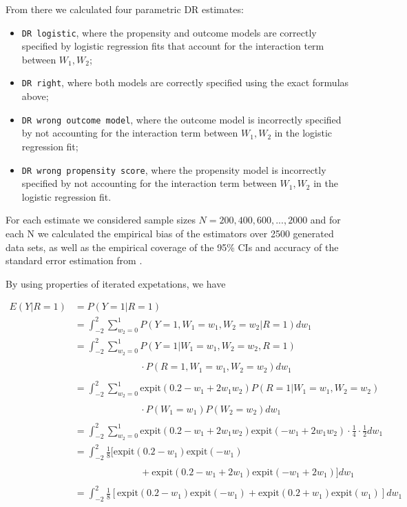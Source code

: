 \documentclass[12pt,twoside]{article}
\newcommand{\expit}{\text{expit}}
\begin{document}
From there we calculated four parametric DR estimates: 
\begin{itemize}
    \item \texttt{DR logistic}, where the propensity and outcome models are correctly specified by logistic regression fits that account for the interaction term between $W_1, W_2$;
    \item \texttt{DR right}, where both models are correctly specified using the exact formulas above;
    \item \texttt{DR wrong outcome model}, where the outcome model is incorrectly specified by not accounting for the interaction term between $W_1, W_2$ in the logistic regression fit;
    \item \texttt{DR wrong propensity score}, where the propensity model is incorrectly specified by not accounting for the interaction term between $W_1, W_2$ in the logistic regression fit.
\end{itemize}

For each estimate we considered sample sizes $N = 200, 400, 600, ..., 2000$ and for each N we calculated the empirical bias of the estimators over 2500 generated data sets, as well as the empirical coverage of the 95\% CIs and accuracy of the standard error estimation from \citet{lunceford_davidian}.

By using properties of iterated expetations, we have

\begin{align*}
    E(Y|R = 1) &= P(Y = 1|R = 1)\\
    &= \int_{-2}^{2} \sum_{w_2 = 0}^{1} P(Y = 1, W_1 = w_1, W_2 = w_2|R = 1) dw_1 \\
    & = \int_{-2}^{2} \sum_{w_2 = 0}^{1} P(Y = 1|W_1 = w_1, W_2 = w_2, R = 1) \\
    & \phantom{ = \int_{-2}^{2} \sum_{w_2 = 0}^{1}} \cdot P(R = 1, W_1 = w_1, W_2 = w_2)dw_1 \\
    & = \int_{-2}^{2} \sum_{w_2 = 0}^{1} \expit(0.2 - w_1 + 2w_1w_2)P(R = 1|W_1 = w_1, W_2 = w_2) \\
    &\phantom{ = \int_{-2}^{2} \sum_{w_2 = 0}^{1}} \cdot P(W_1 = w_1)P(W_2 = w_2)dw_1 \\
    & = \int_{-2}^{2} \sum_{w_2 = 0}^{1} \expit(0.2 - w_1 + 2w_1w_2)\expit(-w_1+2w_1w_2) \cdot \frac{1}{4}\cdot \frac{1}{2}dw_1 \\
    & = \int_{-2}^{2} \frac{1}{8}[\expit(0.2 - w_1)\expit(-w_1) \\
    &\phantom{ = \int_{-2}^{2} \sum_{w_2 = 0}^{1}} +\expit(0.2 - w_1 + 2w_1)\expit(-w_1+2w_1)]dw_1 \\
    & = \int_{-2}^{2} \frac{1}{8}[\expit(0.2 - w_1)\expit(-w_1) +\expit(0.2 + w_1)\expit(w_1)]dw_1 \\
\end{align*}
\end{document}
